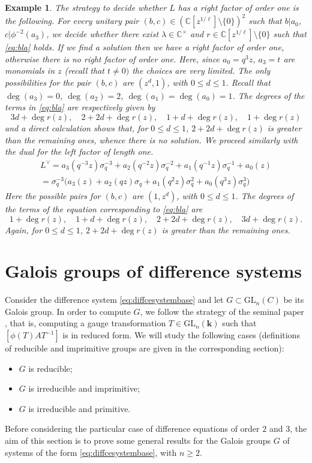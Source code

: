 \documentclass[a4paper,11pt]{amsart}
\renewcommand{\geq}{\geqslant}
\renewcommand{\leq}{\leqslant}
\newcommand{\sigmaq}{\sigma_{q}}
\newcommand{\GL}{\operatorname{GL}}
\newtheorem{ex}[thm]{Example}
\def\k{\mathbf{k}}
\def\GL{\mathrm{GL}}
\def\C{\mathbb{C}}
\begin{document}
\begin{ex}
The strategy to decide whether $L$ has a right factor of order one is the following.  For every unitary pair   $(b,c)\in \left( \C[z^{1/\ell}]\setminus \{0\}\right)^2$ such that $b \vert a_{0}$,   $c \vert \phi^{-2}(a_{3})$,  we decide whether there exist $\lambda \in \C^{\times}$ and $r\in \C[z^{1/\ell}] \setminus \{0\}$ such that \eqref{eq:bla} holds. If we find a solution then we have a right factor of order one, otherwise there is no right factor of order one.
Here, since $a_0=q^3 z$, $a_3=t$ are monomials in $z$ (recall that $t\neq 0)$ the choices are very limited. The only possibilities for the pair $(b,c)$ are $(z^d,1)$, with $0\leq d\leq 1 $.   Recall that $\deg(a_3)=0$,  $\deg(a_2)=2$,  $\deg(a_1)=\deg(a_0)=1$.  
The degrees of the terms in \eqref{eq:bla} are respectively given by  
$$3d+\deg r(z), \quad 2+2d+\deg r(z), \quad 1+d+\deg r(z), \quad 1+\deg r(z)$$
and a direct calculation shows that, for $0\leq d\leq 1 $,  $2+2d+\deg r(z)$ is greater than the remaining ones, whence there is no solution.
  We proceed similarly with the dual for the left factor of length one.
  \begin{multline*}
 L^{\vee}=a_{3}(q^{-3}z)\sigmaq^{-3}  + a_{2}(q^{-2}z)\sigmaq^{-2} +a_{1}(q^{-1}z)\sigmaq^{-1} +a_{0}(z)\\
=\sigmaq^{-3}\Big(a_{3}(z)  +a_{2}(qz)\sigmaq +a_{1}(q^{2}z)\sigmaq^{2} +a_{0}(q^{3}z)\sigmaq^{3}\Big)
\end{multline*} 
Here the possible pairs for $(b,c)$ are $( 1,z^d)$, with $0\leq d\leq 1 $. The degrees of the terms of the equation corresponding to \eqref{eq:bla}  are
$$1+\deg r(z), \quad 1+d+\deg r(z), \quad 2+2d+\deg r(z), \quad 3d+ \deg r(z) .$$
Again, for $0\leq d\leq 1 $,  $2+2d+\deg r(z)$ is greater than the remaining ones.
\end{ex}


\section{Galois groups of difference systems}\label{sec:GaloisGpDiffceSystems}

Consider the difference system \eqref{eq:diffcesystembase} and let 
 $G\subset \GL_{n}(C)$ be its Galois group.   In order to compute $G$, we follow the strategy of the seminal paper \cite{hendriks1998algorithm}, that is,  computing a gauge transformation $T\in \mathrm{GL}_n (\k)$ such that $[\phi(T)AT^{-1}]$ is in reduced form.  We will study the following cases (definitions of reducible and imprimitive groups are given in the corresponding section): 
 \begin{itemize}
 \item $G$ is reducible;
 \item $G$ is irreducible and imprimitive;
 \item $G$ is irreducible and primitive. 
 \end{itemize}
Before considering the particular case of difference equations of order $2$ and $3$, the aim of this section is to prove some general results for the Galois groups $G$ of systems of the form \eqref{eq:diffcesystembase}, with $n\geq 2$.  
\end{document}
